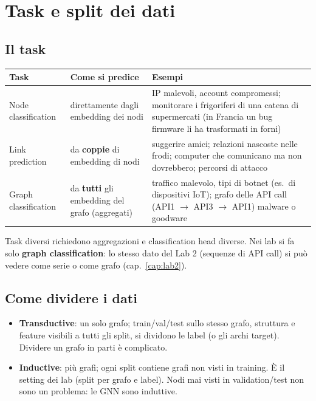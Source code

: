 \section{Task e split dei dati}
\subsection{Il task}
\begin{center}
\small
\begin{tabularx}{\textwidth}{l X X}
\toprule
\textbf{Task} & \textbf{Come si predice} & \textbf{Esempi}\\
\midrule
Node classification & direttamente dagli embedding dei nodi & IP malevoli, account compromessi; monitorare i frigoriferi di una catena di supermercati (in Francia un bug firmware li ha trasformati in forni)\\
Link prediction & da \textbf{coppie} di embedding di nodi & suggerire amici; relazioni nascoste nelle frodi; computer che comunicano ma non dovrebbero; percorsi di attacco\\
Graph classification & da \textbf{tutti} gli embedding del grafo (aggregati) & traffico malevolo, tipi di botnet (es.\ di dispositivi IoT); grafo delle API call (API1 $\to$ API3 $\to$ API1) malware o goodware\\
\bottomrule
\end{tabularx}
\end{center}
Task diversi richiedono aggregazioni e classification head diverse. Nei lab si fa solo \textbf{graph classification}: lo stesso dato del Lab 2
(sequenze di API call) si può vedere come serie o come grafo (cap.~\ref{cap:lab2}).

\subsection{Come dividere i dati}
\begin{itemize}
  \item \textbf{Transductive}: un solo grafo; train/val/test sullo stesso grafo, struttura e feature visibili a tutti gli split, si dividono le
        label (o gli archi target). Dividere un grafo in parti è complicato.
  \item \textbf{Inductive}: più grafi; ogni split contiene grafi non visti in training. È il setting dei lab (split per grafo e label).
        Nodi mai visti in validation/test non sono un problema: le GNN sono induttive.
\end{itemize}

